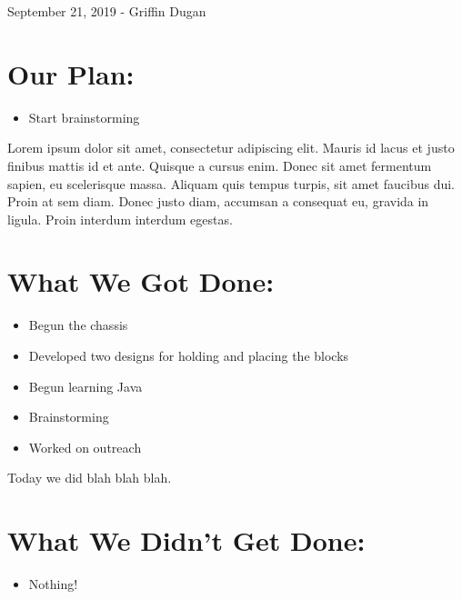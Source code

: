 \documentclass[12pt]{article}
\begin{document}
September 21, 2019 - Griffin Dugan

\section{Our Plan:} %
\begin{itemize}
	\item Start brainstorming
\end{itemize}

Lorem ipsum dolor sit amet, consectetur adipiscing elit. Mauris id lacus et justo finibus mattis id et ante. Quisque a cursus enim. Donec sit amet fermentum sapien, eu scelerisque massa. Aliquam quis tempus turpis, sit amet faucibus dui. Proin at sem diam. Donec justo diam, accumsan a consequat eu, gravida in ligula. Proin interdum interdum egestas.

\section{What We Got Done:} %
\begin{itemize}
	\item Begun the chassis
\item Developed two designs for holding and placing the blocks
\item Begun learning Java
\item Brainstorming
\item Worked on outreach
\end{itemize}

Today we did blah blah blah.

\section{What We Didn't Get Done:} %
\begin{itemize}
	\item Nothing!
\end{itemize}
\end{document}
